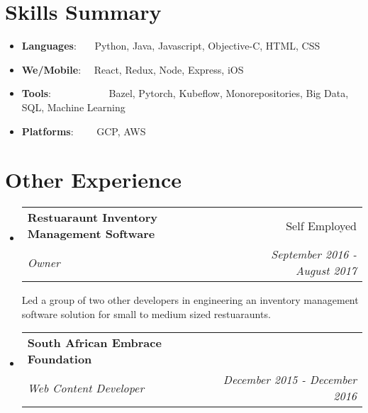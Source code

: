 \documentclass[a4paper,20pt]{article}
\makeatletter
\newcommand{\resumeItem}[2]{
  \item\small{
    \textbf{#1}{: #2 \vspace{-2pt}}
  }
}
\newcommand{\resumeSubheading}[4]{
  \vspace{-1pt}\item
    \begin{tabular*}{0.97\textwidth}{l@{\extracolsep{\fill}}r}
      \textbf{#1} & #2 \\
      \textit{#3} & \textit{#4} \\
    \end{tabular*}\vspace{-5pt}
}
\newcommand{\resumeSubItem}[2]{\resumeItem{#1}{#2}\vspace{-3pt}}
\newcommand{\resumeSubHeadingListStart}{\begin{itemize}[leftmargin=*]}
\newcommand{\resumeSubHeadingListEnd}{\end{itemize}}
\makeatother
\begin{document}
\vspace{-5pt}
\section{Skills Summary}
	\resumeSubHeadingListStart
	\resumeSubItem{Languages}{~~~Python, Java, Javascript, Objective-C, HTML, CSS}
	\resumeSubItem{We/Mobile}{~~React, Redux, Node, Express, iOS}
	\resumeSubItem{Tools}{~~~~~~~~~~~Bazel, Pytorch, Kubeflow, Monorepositories, Big Data, SQL, Machine Learning}
	\resumeSubItem{Platforms}{~~~~GCP, AWS}
\resumeSubHeadingListEnd

\vspace{-5pt}
\section{Other Experience}
\resumeSubHeadingListStart

\resumeSubheading{Restuaraunt Inventory Management Software}{Self Employed}
{Owner}{September 2016 - August 2017}
\vspace{5pt}

Led a group of two other developers in engineering an inventory management software solution for 
small to medium sized restuaraunts.


\resumeSubheading{South African Embrace Foundation}{}
{Web Content Developer}{December 2015 - December 2016}
\vspace{5pt}

\resumeSubHeadingListEnd
\end{document}
